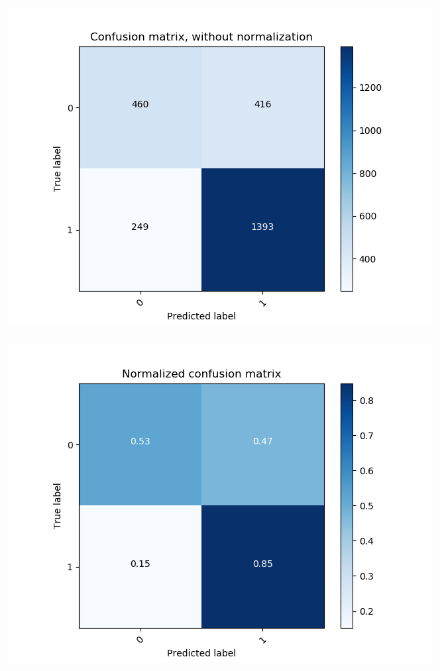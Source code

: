 \begin{figure}[H]
\begin{minipage}[b]{0.45\columnwidth}
	\centering
	\includegraphics[clip, width=\linewidth]{fig/chapter4/count_pretrain_False_he_True}
	\label{fig:count_he_preprocess}
    \end{minipage}
	\begin{minipage}[b]{0.45\columnwidth}
		\centering
		\includegraphics[clip, width=\linewidth]{fig/chapter4/pretrain_False_he_True}
		\label{fig:he_preprocess}
	\end{minipage}
	\begin{minipage}[b]{0.45\columnwidth}
	\centering

\end{minipage}
\end{figure}
